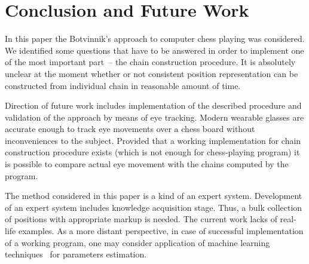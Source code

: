 \documentclass{llncs}
\begin{document}
\section{Conclusion and Future Work}
In this paper the Botvinnik's approach to computer chess playing was considered. We
identified some questions that have to be answered in order to
implement one of the most important part~-- the chain construction procedure. It is
absolutely unclear at the moment whether or not consistent position
representation can be constructed from individual chain in reasonable
amount of time.

Direction of future work includes implementation of the described
procedure and validation of the approach by means of eye
tracking. Modern wearable glasses are accurate enough to track eye
movements over a chess board without inconveniences to the
subject. Provided that a working implementation for chain construction
procedure exists (which is not enough for chess-playing program) it is
possible to compare actual eye movement with the chains computed by the
program.

The method considered in this paper is a kind of an expert system. Development of an expert system includes knowledge acquisition stage. Thus, a bulk collection of positions with appropriate markup is needed. The current work lacks of real-life examples. As a more distant perspective, in case of successful
implementation of a working program, one may consider application of
machine learning
techniques~\cite{Fogel:2004:self-learning,Wirth:2015:on-learning} for
parameters estimation.


{\small
}
\end{document}
